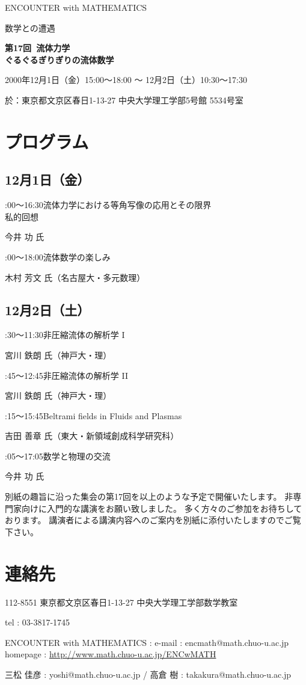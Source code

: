 \documentclass[uplatex,dvipdfmx]{jlreq}
\newcommand{\talk}[3]{%
\noindent
#1\quad #2\par
\hspace*{2em}#3\par\smallskip
}
\newcommand{\EwMnumber}{第17回}
\newcommand{\EwMtitle}{流体力学\\[2mm]\large ぐるぐるぎりぎりの流体数学}
\newcommand{\EwMdate}{2000年12月1日（金）15:00～18:00 ～ 12月2日（土）10:30～17:30}
\newcommand{\EwMplace}{東京都文京区春日1-13-27 中央大学理工学部5号館 5534号室}
\newcommand{\EwMtitleblock}{

\vspace*{-5mm}

\begin{center}

{\Large ENCOUNTER with MATHEMATICS}

\vspace{2mm}

{\large 数学との遭遇}

\vspace{4mm}

{\Large \bfseries \EwMnumber\ \EwMtitle}

\vspace{4mm}

\EwMdate

\vspace{2mm}

於：\EwMplace

\end{center}

\vspace{2mm}

}
\begin{document}
\EwMtitleblock


\section*{プログラム}

\subsection*{12月1日（金）}

\talk
{15:00～16:30}
{流体力学における等角写像の応用とその限界\\[1mm]私的回想}
{今井 功 氏}

\talk
{17:00～18:00}
{流体数学の楽しみ}
{木村 芳文 氏（名古屋大・多元数理）}

\subsection*{12月2日（土）}

\talk
{10:30～11:30}
{非圧縮流体の解析学 I}
{宮川 鉄朗 氏（神戸大・理）}

\talk
{11:45～12:45}
{非圧縮流体の解析学 II}
{宮川 鉄朗 氏（神戸大・理）}

\talk
{14:15～15:45}
{Beltrami fields in Fluids and Plasmas}
{吉田 善章 氏（東大・新領域創成科学研究科）}

\talk
{16:05～17:05}
{数学と物理の交流}
{今井 功 氏}


\bigskip

別紙の趣旨に沿った集会の第17回を以上のような予定で開催いたします。  
非専門家向けに入門的な講演をお願い致しました。  
多く方々のご参加をお待ちしております。  
講演者による講演内容へのご案内を別紙に添付いたしますのでご覧下さい。


\section*{連絡先}

112-8551 東京都文京区春日1-13-27 中央大学理工学部数学教室 

tel : 03-3817-1745  

ENCOUNTER with MATHEMATICS : e-mail : encmath@math.chuo-u.ac.jp  
homepage : \url{http://www.math.chuo-u.ac.jp/ENCwMATH}  

三松 佳彦 : yoshi@math.chuo-u.ac.jp / 高倉 樹 : takakura@math.chuo-u.ac.jp
\end{document}
